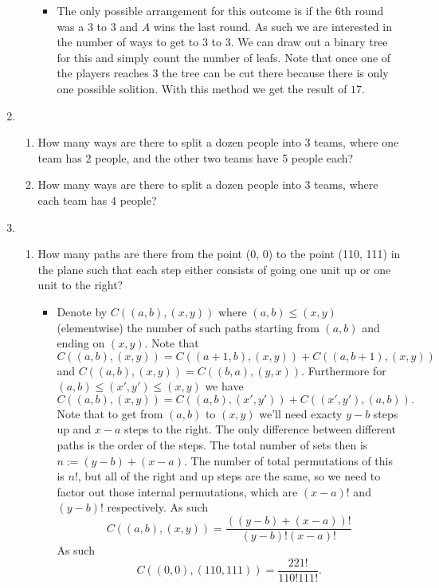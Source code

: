 \documentclass{article}
\begin{document}
\begin{enumerate}
\begin{enumerate}
				\begin{itemize}
					\item The only possible arrangement for this outcome is if the $6$th round was a $3$ to $3$ and $A$ wins the last round. As such we are interested in the number of ways to get to $3$ to $3$. We can draw out a binary tree for this and simply count the number of leafs. Note that once one of the players reaches $3$ the tree can be cut there because there is only one possible solition. With this method we get the result of $17$.
				\end{itemize}
		\end{enumerate}
	\item
		\begin{enumerate}
			\item How many ways are there to split a dozen people into 3 teams, where one team has 2 people, and the other two teams have 5 people each?
			\item How many ways are there to split a dozen people into 3 teams, where each team has 4 people?
		\end{enumerate}
	\item
		\begin{enumerate}
			\item How many paths are there from the point (0, 0) to the point (110, 111) in the plane such that each step either consists of going one unit up or one unit to the right?
				\begin{itemize}
					\item Denote by $C((a, b), (x, y))$ where $(a, b) \leq (x, y)$ (elementwise) the number of such paths starting from $(a, b)$ and ending on $(x, y)$. Note that $C((a, b), (x, y)) = C((a + 1, b), (x, y)) + C((a, b + 1), (x, y))$ and $C((a, b), (x, y)) = C((b, a), (y, x))$. Furthermore for $(a, b) \leq (x', y') \leq (x, y)$ we have
					$$
					C((a, b), (x, y)) = C((a, b), (x', y')) + C((x', y'), (a, b)).
					$$
					Note that to get from $(a, b)$ to $(x, y)$ we'll need exacty $y - b$ steps up and $x - a$ steps to the right. The only difference between different paths is the order of the steps. The total number of sets then is $n := (y - b) + (x - a)$. The number of total permutations of this is $n!$, but all of the right and up steps are the same, so we need to factor out those internal permutations, which are $(x - a)!$ and $(y - b)!$ respectively. As such
					$$
					C((a, b), (x, y)) = \frac{((y - b) + (x - a))!}{(y - b)!(x - a)!}
					$$
					As such
					$$
					C((0, 0), (110, 111)) = \frac{221!}{110!111!}.
					$$

\end{itemize}
\end{enumerate}
\end{enumerate}
\end{document}
